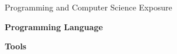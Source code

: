 \documentclass[handout]{beamer}
\begin{document}
\begin{frame}{Programming and Computer Science Exposure}

\textbf{Programming Language}
\vspace{1em}

\begin{minipage}{0.16\textwidth}
	\begin{figure}[t]
		\begin{tikzpicture}[scale=1.0, every node/.style={scale=1.0}]
				
		\end{tikzpicture}
	\end{figure}
\end{minipage}
\vspace{2em}

\textbf{Tools}
\vspace{1em}

\begin{minipage}{0.95\textwidth}
	\begin{figure}[t]	
		\begin{tikzpicture}[scale=1.0, every node/.style={scale=1.0}]
				
		\end{tikzpicture}
	\end{figure}
\end{minipage}



\end{frame}
\end{document}
